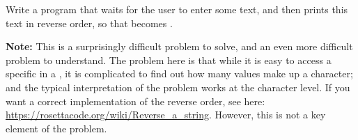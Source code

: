 Write a program that waits for the user to enter some text, and then prints this text in reverse order, so that  becomes .

\textbf{Note:} This is a surprisingly difficult problem to solve, and an even more difficult problem to understand. The problem here is that while it is easy to access a specific  in a , it is complicated to find out how many  values ​​make up a character; and the typical interpretation of the problem works at the character level. If you want a correct implementation of the reverse order, see here: \url{https://rosettacode.org/wiki/Reverse_a_string}. However, this is not a key element of the problem.
